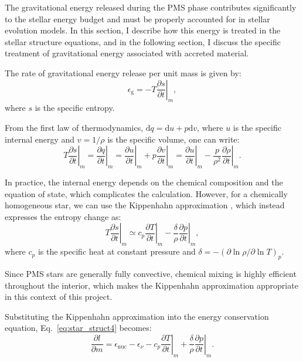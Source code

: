\documentclass[12pt,a4paper]{article}
\newcommand{\mr}{\mathrm}
\newcommand{\pfird}[2][]{\frac{\partial#1}{\partial#2}}
\newcommand{\dd}[1]{\mathrm{d}#1}
\begin{document}
The gravitational energy released during the PMS phase contributes significantly to the stellar energy budget and must be properly accounted for in stellar evolution models. In this section, I describe how this energy is treated in the stellar structure equations, and in the following section, I discuss the specific treatment of gravitational energy associated with accreted material.

The rate of gravitational energy release per unit mass is given by:
\begin{equation}
  \epsilon_\mr{g} = -T\left.\pfird[s]{t}\right|_m, \label{eq:grav_energy}
\end{equation}
where $s$ is the specific entropy.

From the first law of thermodynamics, $\dd{q} = \dd{u} + p\dd{v}$, where $u$ is the specific internal energy and $v = 1/\rho$ is the specific volume, one can write:
\begin{equation}
  T\left.\pfird[s]{t}\right|_m = \left.\pfird[q]{t}\right|_m = \left.\pfird[u]{t}\right|_m + p\left.\pfird[v]{t}\right|_m = \left.\pfird[u]{t}\right|_m - \frac{p}{\rho^2}\left.\pfird[\rho]{t}\right|_m.
\end{equation}

In practice, the internal energy depends on the chemical composition and the equation of state, which complicates the calculation. However, for a chemically homogeneous star, we can use the Kippenhahn approximation \parencite{KippenhahnEtAl2013}, which instead expresses the entropy change as:
\begin{equation}
  T\left.\pfird[s]{t}\right|_m \simeq c_p\left.\pfird[T]{t}\right|_m - \frac{\delta}{\rho}\left.\pfird[p]{t}\right|_m, \label{eq:grav_energy_kipp}
\end{equation}
where $c_p$ is the specific heat at constant pressure and $\delta = -\left(\partial \ln \rho / \partial \ln T\right)_p$. 

Since PMS stars are generally fully convective, chemical mixing is highly efficient throughout the interior, which makes the Kippenhahn approximation appropriate in this context of this project.

Substituting the Kippenhahn approximation into the energy conservation equation, Eq.~\eqref{eq:star_struct4} becomes:
\begin{equation}
  \pfird[l]{m} = \epsilon_\mr{nuc} - \epsilon_\nu - \left.c_p\pfird[T]{t}\right|_m + \frac{\delta}{\rho}\left.\pfird[p]{t}\right|_m. \label{eq:star_struct4_kipp}
\end{equation}
\end{document}

